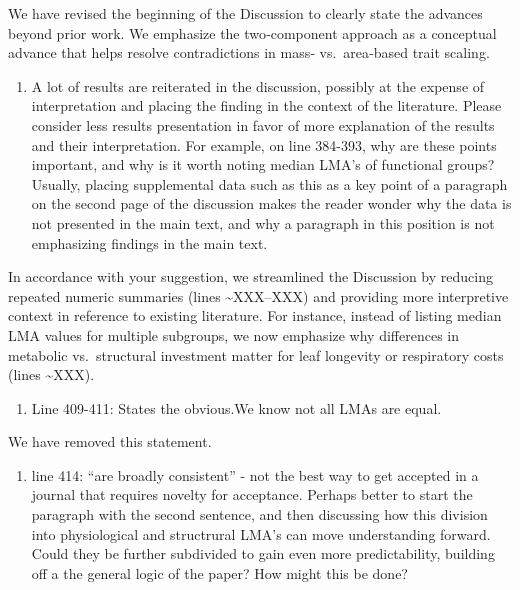 \documentclass[
  12pt,
  letterpaper,
  DIV=11,
  numbers=noendperiod]{scrartcl}
\providecommand{\tightlist}{%
  \setlength{\itemsep}{0pt}\setlength{\parskip}{0pt}}\usepackage{longtable,booktabs,array}
\renewenvironment{quote}
  {\begin{customblockquote}\color{blockquote-text}\ignorespaces}
  {\end{customblockquote}}
\begin{document}
We have revised the beginning of the Discussion to clearly state the
advances beyond prior work. We emphasize the two‐component approach as a
conceptual advance that helps resolve contradictions in mass‐
vs.~area‐based trait scaling.

\begin{quote}
\begin{enumerate}
\def\labelenumi{\arabic{enumi})}
\setcounter{enumi}{1}
\tightlist
\item
  A lot of results are reiterated in the discussion, possibly at the
  expense of interpretation and placing the finding in the context of
  the literature. Please consider less results presentation in favor of
  more explanation of the results and their interpretation. For example,
  on line 384-393, why are these points important, and why is it worth
  noting median LMA's of functional groups? Usually, placing
  supplemental data such as this as a key point of a paragraph on the
  second page of the discussion makes the reader wonder why the data is
  not presented in the main text, and why a paragraph in this position
  is not emphasizing findings in the main text.
\end{enumerate}
\end{quote}

In accordance with your suggestion, we streamlined the Discussion by
reducing repeated numeric summaries (lines \textasciitilde XXX--XXX) and
providing more interpretive context in reference to existing literature.
For instance, instead of listing median LMA values for multiple
subgroups, we now emphasize why differences in metabolic vs.~structural
investment matter for leaf longevity or respiratory costs (lines
\textasciitilde XXX).

\begin{quote}
\begin{enumerate}
\def\labelenumi{\arabic{enumi})}
\setcounter{enumi}{2}
\tightlist
\item
  Line 409-411: States the obvious.We know not all LMAs are equal.
\end{enumerate}
\end{quote}

We have removed this statement.

\begin{quote}
\begin{enumerate}
\def\labelenumi{\arabic{enumi})}
\setcounter{enumi}{3}
\tightlist
\item
  line 414: ``are broadly consistent'' - not the best way to get
  accepted in a journal that requires novelty for acceptance. Perhaps
  better to start the paragraph with the second sentence, and then
  discussing how this division into physiological and structrural LMA's
  can move understanding forward. Could they be further subdivided to
  gain even more predictability, building off a the general logic of the
  paper? How might this be done?
\end{enumerate}
\end{quote}
\end{document}
